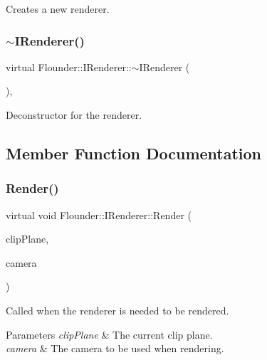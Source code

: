 Creates a new renderer. 

\mbox{\label{class_flounder_1_1_i_renderer_a0f8b50fb245f566a680f6d36710d6142}} 
\subsubsection{\texorpdfstring{$\sim$\+I\+Renderer()}{~IRenderer()}}
{\footnotesize\ttfamily virtual Flounder\+::\+I\+Renderer\+::$\sim$\+I\+Renderer (\begin{DoxyParamCaption}{ }\end{DoxyParamCaption})\hspace{0.3cm}{\ttfamily [inline]}, {\ttfamily [virtual]}}



Deconstructor for the renderer. 



\subsection{Member Function Documentation}
\mbox{\label{class_flounder_1_1_i_renderer_a4e86d6621f6f63442e1c07655afd9daa}} 
\subsubsection{\texorpdfstring{Render()}{Render()}}
{\footnotesize\ttfamily virtual void Flounder\+::\+I\+Renderer\+::\+Render (\begin{DoxyParamCaption}\item[{const \hyperlink{class_flounder_1_1_vector4}{Vector4} \&}]{clip\+Plane,  }\item[{const \hyperlink{class_flounder_1_1_i_camera}{I\+Camera} \&}]{camera }\end{DoxyParamCaption})\hspace{0.3cm}{\ttfamily [pure virtual]}}



Called when the renderer is needed to be rendered. 


\begin{DoxyParams}{Parameters}
{\em clip\+Plane} & The current clip plane. \\
\hline
{\em camera} & The camera to be used when rendering. \\
\hline
\end{DoxyParams}


